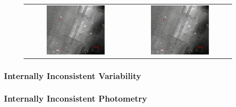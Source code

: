         \begin{figure}
        \begin{tabular}{cc}
        \includegraphics[width=0.6\textwidth]{Ch2/moonflg_HIP114340_W3_88}&
        \includegraphics[width=0.6\textwidth]{Ch2/moonflg_HIP114340_W3_88}
        \end{tabular}
        \caption[]{}
        \label{fig:moonflag_contamination}
        \end{figure}

        
        \subsubsection{Internally Inconsistent Variability}
    
        \subsubsection{Internally Inconsistent Photometry}
    
